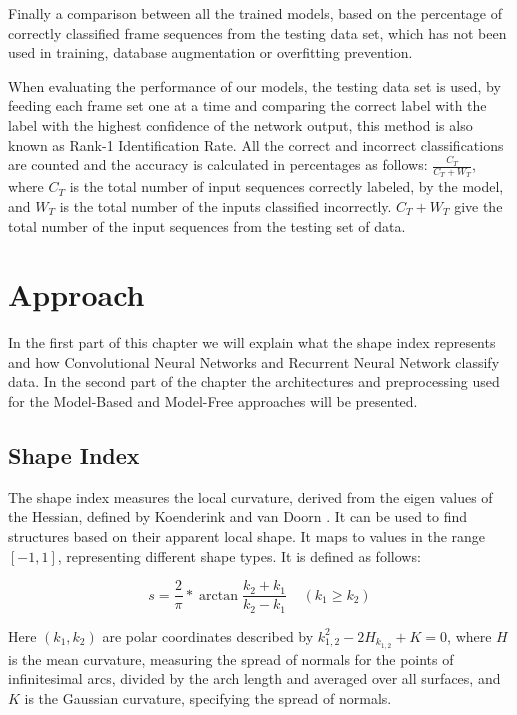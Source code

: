 \documentclass[12pt]{article}
\theoremstyle{definition}
\begin{document}
	Finally a comparison between all the trained models, based on the percentage of correctly classified frame sequences from the testing data set, which has not been used in training, database augmentation or overfitting prevention.

	When evaluating the performance of our models, the testing data set is used, by feeding each frame set one at a time and comparing the correct label with the label with the highest confidence of the network output, this method is also known as Rank-1 Identification Rate. All the correct and incorrect classifications are counted and the accuracy is calculated in percentages as follows: $\frac{C_T}{C_T + W_T}$, where $C_T$ is the total number of input sequences correctly labeled, by the model, and $W_T$ is the total number of the inputs classified incorrectly. $C_T + W_T$ give the total number of the input sequences from the testing set of data.

	\clearpage

	\section{Approach}
	\vspace{1cm}

	In the first part of this chapter we will explain what the shape index represents and how Convolutional Neural Networks and Recurrent Neural Network classify data. In the second part of the chapter the architectures and preprocessing used for the Model-Based and Model-Free approaches will be presented.

	\subsection{Shape Index}
	The shape index measures the local curvature, derived from the eigen values of the Hessian, defined by Koenderink and van Doorn \cite{shape-index}. It can be used to find structures based on their apparent local shape. It maps to values in the range $[-1, 1]$, representing different shape types. It is defined as follows:

	\begin{equation*}
	s=\frac{2}{\pi}*\arctan{\frac{k_2+k_1}{k_2-k_1}} \;\;\;\;  (k_1 \geq k_2)
	\end{equation*}

	Here $(k_1, k_2)$ are polar coordinates described by $k_{1,2}^2-2H_{k_{1,2}}+K=0$, where $H$ is the mean curvature, measuring the spread of normals for the points of infinitesimal arcs, divided by the arch length and averaged over all surfaces, and $K$ is the Gaussian curvature, specifying the spread of normals.
\end{document}
